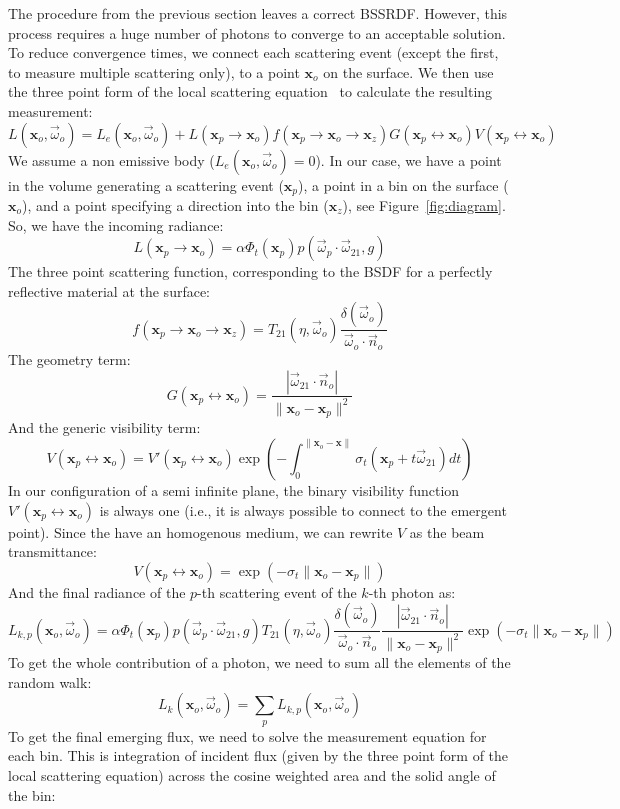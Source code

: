 \documentclass[10pt,a4paper]{article}
\newcommand{\x}{\mathbf{x}}
\newcommand{\y}{\mathbf{x}_o}
\newcommand{\z}{\mathbf{x}_z}
\newcommand{\vomega}{\vec{\omega}}
\begin{document}
The procedure from the previous section leaves a correct BSSRDF. However, this process requires a huge number of photons to converge to an acceptable solution. To reduce convergence times, we connect each scattering event (except the first, to measure multiple scattering only), to a point $\x_o$ on the surface. We then use the three point form of the local scattering equation~\cite{raab08} to calculate the resulting measurement:
$$
L(\x_o, \vomega_o) =  L_e(\x_o, \vomega_o) + L(\x_p \rightarrow \x_o) f(\x_p \rightarrow \x_o \rightarrow \x_z) G(\x_p \leftrightarrow \x_o) V(\x_p \leftrightarrow \x_o)
$$
We assume a non emissive body ($L_e(\x_o, \vomega_o) = 0$). In our case, we have a point in the volume generating a scattering event ($\x_p$), a point in a bin on the surface ($\y$), and a point specifying a direction into the bin ($\z$), see Figure~\ref{fig:diagram}. So, we have the incoming radiance:
$$
L(\x_p \rightarrow \y) = \alpha \Phi_t(\mathbf{x}_p) p(\vomega_p \cdot \vomega_{21}, g)
$$
The three point scattering function, corresponding to the BSDF for a perfectly reflective material at the surface:
$$
f(\x_p \rightarrow \y \rightarrow \z) = T_{21}(\eta, \vomega_o) \frac{\delta(\vomega_o)}{\vomega_o\cdot\vec{n}_o }
$$
The geometry term:
$$
G(\x_p \leftrightarrow \y) = \frac{|\vomega_{21}\cdot\vec{n}_o |}{\|\y - \x_p\|^2}
$$
And the generic visibility term:
$$
V(\x_p \leftrightarrow \y) = V'(\x_p \leftrightarrow \y) \exp\left(-\int_0^{\|\y - \x\|} \sigma_t\left(\x_p + t \vomega_{21}\right) dt\right)
$$
In our configuration of a semi infinite plane, the binary visibility function $V'(\x_p \leftrightarrow \y)$ is always one (i.e., it is always possible to connect to the emergent point). Since the have an homogenous medium, we can rewrite $V$ as the beam transmittance:
$$
V(\x_p \leftrightarrow \y) = \exp(-\sigma_t \|\y - \x_p\|)
$$
And the final radiance of the $p$-th scattering event of the $k$-th photon as:
$$
L_{k,p}(\x_o, \vomega_o) = \alpha \Phi_t(\mathbf{x}_p) p(\vomega_p \cdot \vomega_{21}, g)  T_{21}(\eta, \vomega_o) \frac{\delta(\vomega_o)}{\vomega_o\cdot\vec{n}_o }  \frac{|\vomega_{21}\cdot\vec{n}_o |}{\|\y - \x_p\|^2}  \exp(-\sigma_t \|\y - \x_p\|)
$$
To get the whole contribution of a photon, we need to sum all the elements of the random walk:
$$
L_k(\x_o, \vomega_o) = \sum_p L_{k,p}(\x_o, \vomega_o)
$$
To get the final emerging flux, we need to solve the measurement equation for each bin. This is integration of incident flux (given by the three point form of the local scattering equation) across the cosine weighted area and the solid angle of the bin:
\end{document}
